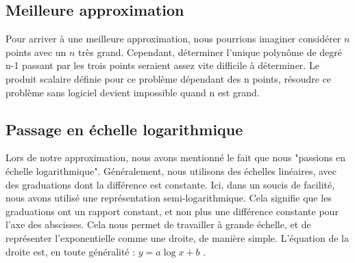 \subsection{Meilleure approximation}

Pour arriver à une meilleure approximation, nous pourrions imaginer considérer $n$ points avec un
$n$ très grand. Cependant, déterminer l'unique polynôme de degré n-1 passant par les trois points seraient assez vite difficile à déterminer. Le produit scalaire définie pour ce problème dépendant des n points, résoudre ce problème sans logiciel devient impossible quand n est grand.  

\subsection{Passage en échelle logarithmique}

Lors de notre approximation, nous avons mentionné le fait que nous "passions en échelle logarithmique".
Généralement, nous utilisons des échelles linéaires, avec des graduations dont la différence est constante.
Ici, dans un soucis de facilité, nous avons utilisé une représentation semi-logarithmique. Cela signifie
que les graduations ont un rapport constant, et non plus une différence constante pour l'axe des abscisses.
Cela nous permet de travailler à grande échelle, et de représenter l'exponentielle comme une droite, de
manière simple. L'équation de la droite est, en toute généralité : $y=a\log{x}+b$ .




